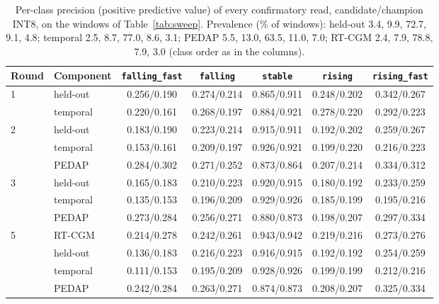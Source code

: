 \documentclass[10pt,twocolumn]{article}
\begin{document}
\begin{table}[!tp]
\centering
\caption{Per-class precision (positive predictive value) of every
confirmatory read, candidate/champion INT8, on the windows of
Table~\ref{tab:sweep}. Prevalence (\% of windows): held-out 3.4, 9.9,
72.7, 9.1, 4.8; temporal 2.5, 8.7, 77.0, 8.6, 3.1; PEDAP 5.5, 13.0, 63.5,
11.0, 7.0; RT-CGM 2.4, 7.9, 78.8, 7.9, 3.0 (class order as in the
columns).}
\label{tab:sweepprecision}
\footnotesize
\begin{tabular}{@{}llccccc@{}}
\toprule
Round & Component & \texttt{falling\_fast} & \texttt{falling} & \texttt{stable} & \texttt{rising} & \texttt{rising\_fast} \\
\midrule
1 & held-out & 0.256/0.190 & 0.274/0.214 & 0.865/0.911 & 0.248/0.202 & 0.342/0.267 \\
  & temporal & 0.220/0.161 & 0.268/0.197 & 0.884/0.921 & 0.278/0.220 & 0.292/0.223 \\
2 & held-out & 0.183/0.190 & 0.223/0.214 & 0.915/0.911 & 0.192/0.202 & 0.259/0.267 \\
  & temporal & 0.153/0.161 & 0.209/0.197 & 0.926/0.921 & 0.199/0.220 & 0.216/0.223 \\
  & PEDAP & 0.284/0.302 & 0.271/0.252 & 0.873/0.864 & 0.207/0.214 & 0.334/0.312 \\
3 & held-out & 0.165/0.183 & 0.210/0.223 & 0.920/0.915 & 0.180/0.192 & 0.233/0.259 \\
  & temporal & 0.135/0.153 & 0.196/0.209 & 0.929/0.926 & 0.185/0.199 & 0.195/0.216 \\
  & PEDAP & 0.273/0.284 & 0.256/0.271 & 0.880/0.873 & 0.198/0.207 & 0.297/0.334 \\
5 & RT-CGM & 0.214/0.278 & 0.242/0.261 & 0.943/0.942 & 0.219/0.216 & 0.273/0.276 \\
  & held-out & 0.136/0.183 & 0.216/0.223 & 0.916/0.915 & 0.192/0.192 & 0.254/0.259 \\
  & temporal & 0.111/0.153 & 0.195/0.209 & 0.928/0.926 & 0.199/0.199 & 0.212/0.216 \\
  & PEDAP & 0.242/0.284 & 0.263/0.271 & 0.874/0.873 & 0.208/0.207 & 0.325/0.334 \\
\bottomrule
\end{tabular}
\end{table}
\end{document}
